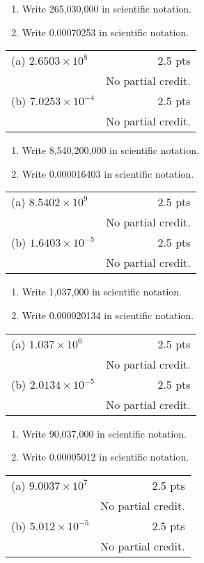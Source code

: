 {
	\begin{enumerate}
	\item Write 265,030,000 in scientific notation.
	\begin{onlyproblem}\spc\end{onlyproblem}
	\item Write 0.00070253 in scientific notation.
	\end{enumerate}
}
{
	\begin{tabular}{l r}
	(a) $2.6503 \times 10^8$ &  2.5 pts\\
	& No partial credit.\\
	(b) $7.0253 \times 10^{-4}$ & 2.5 pts\\
	& No partial credit.
	\end{tabular}
}

{
	\begin{enumerate}
	\item Write 8,540,200,000 in scientific notation.
	\begin{onlyproblem}\spc\end{onlyproblem}
	\item Write 0.000016403 in scientific notation.
	\end{enumerate}
}
{
	\begin{tabular}{l r}
	(a) $8.5402 × 10^9$ & 2.5 pts\\
	& No partial credit.\\
	(b) $1.6403\times 10^{-5}$ & 2.5 pts\\
	& No partial credit.
	\end{tabular}
}

{
	\begin{enumerate}
	\item Write 1,037,000 in scientific notation.
	\begin{onlyproblem}\spc\end{onlyproblem}
	\item Write 0.000020134 in scientific notation.
	\end{enumerate}
}
{
	\begin{tabular}{l r}
	(a) $1.037\times 10^6$ & 2.5 pts\\
	& No partial credit.\\
	(b) $2.0134\times 10^{-5}$ & 2.5 pts\\
	& No partial credit.
	\end{tabular}
}

{
	\begin{enumerate}
	\item Write 90,037,000 in scientific notation.
	\begin{onlyproblem}\spc\end{onlyproblem}
	\item Write 0.00005012 in scientific notation.
	\end{enumerate}
}
{
	\begin{tabular}{l r}
	(a) $9.0037\times 10^7$ & 2.5 pts\\
	& No partial credit.\\
	(b) $5.012\times 10^{-5}$ & 2.5 pts\\
	& No partial credit.
	\end{tabular}
}
